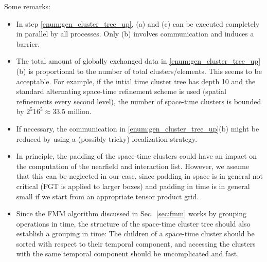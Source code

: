 \documentclass[a4paper,11pt]{article}
\theoremstyle{plain}
\theoremstyle{definition}
\theoremstyle{remark}
\begin{document}
Some remarks: 
\begin{itemize}
  \item In step \ref{enum:gen_cluster_tree_up}, (a) and (c) can be executed completely in parallel by all processes. Only (b) involves communication and induces a barrier.
  \item The total amount of globally exchanged data in \ref{enum:gen_cluster_tree_up}(b) is proportional to the number of total clusters/elements. This seems to be acceptable. For example, if the intial time cluster tree has depth 10 and the standard alternating space-time refinement scheme is used (spatial refinements every second level), the number of space-time clusters is bounded by $2^5 16^5 \approx 33.5$ million. 
  \item If necessary, the communication in \ref{enum:gen_cluster_tree_up}(b) might be reduced by using a (possibly tricky) localization strategy.
  \item In principle, the padding of the space-time clusters could have an impact on the computation of the nearfield and interaction list. However, we assume that this can be neglected in our case, since padding in space is in general not critical (FGT is applied to larger boxes) and padding in time is in general small if we start from an appropriate tensor product grid.
  \item Since the FMM algorithm discussed in Sec.~\ref{sec:fmm} works by grouping operations in time, the structure of the space-time cluster tree should also establish a grouping in time: The children of a space-time cluster should be sorted with respect to their temporal component, and accessing the clusters with the same temporal component should be uncomplicated and fast.
\end{itemize}
\end{document}
